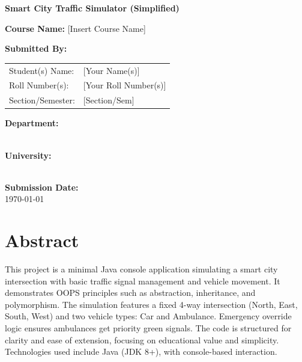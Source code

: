 \documentclass[12pt,a4paper]{article}
\begin{document}
\begin{titlepage}
    \centering
    \vspace*{1cm}
    
    {\Huge \textbf{Smart City Traffic Simulator (Simplified)}} \\
    \vspace{1.5cm}
    
    {\Large \textbf{Course Name:}} [Insert Course Name] \\
    \vspace{1cm}
    
    \textbf{Submitted By:} \\
    \vspace{0.5cm}
    \begin{tabular}{ll}
        Student(s) Name: & [Your Name(s)] \\
        Roll Number(s):  & [Your Roll Number(s)] \\
        Section/Semester: & [Section/Sem] \\
    \end{tabular}
    
    \vspace{1.5cm}
    
    \textbf{Department:} \\
    [Department Name] \\
    \vspace{0.5cm}
    
    \textbf{University:} \\
    [University Name] \\
    
    \vfill
    
    \textbf{Submission Date:} \\
    \today
    
\end{titlepage}

\newpage

\section*{Abstract}
This project is a minimal Java console application simulating a smart city intersection with basic traffic signal management and vehicle movement. It demonstrates OOPS principles such as abstraction, inheritance, and polymorphism. The simulation features a fixed 4-way intersection (North, East, South, West) and two vehicle types: Car and Ambulance. Emergency override logic ensures ambulances get priority green signals. The code is structured for clarity and ease of extension, focusing on educational value and simplicity. Technologies used include Java (JDK 8+), with console-based interaction.
\end{document}
